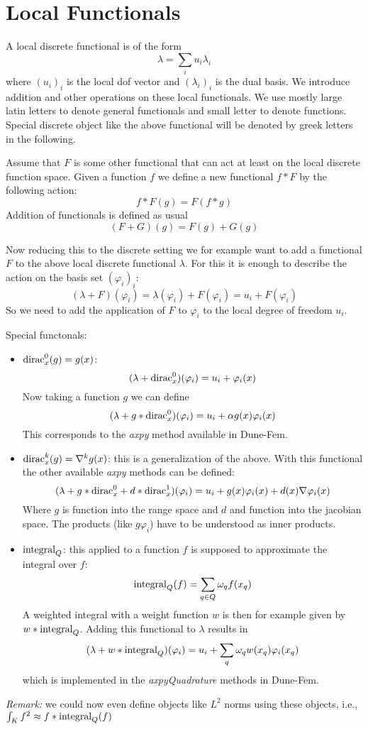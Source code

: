 \documentclass[12pt,a4paper]{article}
\newcommand{\dirac}{ {\rm dirac} }
\newcommand{\integral}{ {\rm integral} }
\begin{document}
\section{Local Functionals}

A local discrete functional is of the form
$$ \lambda = \sum_i u_i\lambda_i $$
where $(u_i)_i$ is the local dof vector and $(\lambda_i)_i$ is the dual
basis. We introduce addition and other operations on these local
functionals. We use mostly large latin letters to denote general
functionals and small letter to denote functions. Special discrete object
like the above functional will be denoted by greek letters in the
following.

Assume that $F$ is some other functional that can act at least on the
local discrete function space. Given a function $f$ we define a new
functional $f*F$ by the following action:
$$ f*F(g) = F(f*g) $$
Addition of functionals is defined as usual
$$ (F+G)(g) = F(g)+G(g) $$

Now reducing this to the discrete setting we for example want to add a
functional $F$ to the above local discrete functional $\lambda$. For this
it is enough to describe the action on the basis set $(\varphi_i)_i$:
$$ (\lambda+F)(\varphi_i) = \lambda(\varphi_i) + F(\varphi_i)
   = u_i + F(\varphi_i) $$
So we need to add the application of $F$ to $\varphi_i$ to the local
degree of freedom $u_i$. 

Special functonals:
\begin{itemize}
\item $\dirac^0_x(g)=g(x)$: 
  $$ (\lambda + \dirac^0_x)(\varphi_i) = u_i + \varphi_i(x) $$
  Now taking a function $g$ we can define
  $$ (\lambda + g*\dirac^0_x)(\varphi_i) = u_i + \alpha g(x)\varphi_i(x) $$
  This corresponds to the \emph{axpy} method available in Dune-Fem.
\item $\dirac^k_x(g)=\nabla^k g(x)$: this is a generalization of the above.
  With this functional the other available \emph{axpy} methods can be
  defined:
  $$ (\lambda + g*\dirac^0_x + d*\dirac^1_x)(\varphi_i) =
     u_i + g(x)\varphi_i(x) + d(x)\nabla\varphi_i(x) $$
  Where $g$ is function into the range space and $d$ and function into the
  jacobian space. The products (like $g\varphi_i$) have to be understood as inner products. 
\item $\integral_Q$: this applied to a function $f$ is supposed to
  approximate the integral over $f$: 
  $$ \integral_Q(f) = \sum_{q\in Q} \omega_q f(x_q) $$
  A weighted integral with a weight function $w$ is then for example given
  by $w*\integral_Q$. Adding this functional to $\lambda$ results in
  $$ (\lambda + w*\integral_Q)(\varphi_i) = 
     u_i + \sum_q \omega_q w(x_q)\varphi_i(x_q) $$ 
  which is implemented in the \emph{axpyQuadrature} methods in Dune-Fem.
\end{itemize}
\emph{Remark:} we could now even define objects like $L^2$ norms using
these objects, i.e., $\int_K f^2 \approx f*\integral_Q(f)$ 
\end{document}
